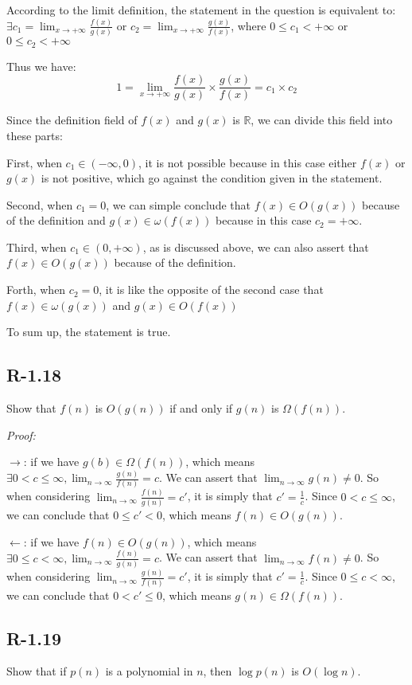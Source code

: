 \documentclass[11pt]{article}
\begin{document}
	According to the limit definition, the statement in the question is equivalent to: $\exists c_1=\lim_{x\to+\infty} \frac{f(x)}{g(x)}$ or $c_2=\lim_{x\to+\infty}\frac{g(x)}{f(x)}$, where $0\leq c_1<+\infty$ or $0\leq c_2<+\infty$
	
	Thus we have:
	\begin{equation*}
		1=\lim_{x\to+\infty} \frac{f(x)}{g(x)} \times \frac{g(x)}{f(x)} = c_1 \times c_2
	\end{equation*}
	
	Since the definition field of $f(x)$ and $g(x)$ is $\mathbb{R}$, we can divide this field into these parts:
	
	First, when $c_1 \in (-\infty,0)$, it is not possible because in this case either $f(x)$ or $g(x)$ is not positive, which go against the condition given in the statement.
	
	Second, when $c_1 = 0$, we can simple conclude that $f(x)\in O(g(x))$ because of the definition and $g(x)\in \omega(f(x))$ because in this case $c_2 = +\infty$.
	
	Third, when $c_1 \in(0,+\infty)$, as is discussed above, we can also assert that $f(x)\in O(g(x))$ because of the definition.
	
	Forth, when $c_2 = 0$, it is like the opposite of the second case that $f(x)\in \omega(g(x))$ and $g(x)\in O(f(x))$
	
	To sum up, the statement is true.
\subsection{R-1.18}
	Show that $f(n)$ is $O(g(n))$ if and only if $g(n)$ is $\Omega(f(n))$.

	\emph{Proof:}

	$\to$: if we have $g(b)\in \Omega(f(n))$, which means $\exists 0<c\leq \infty, \lim_{n\to\infty} \frac{g(n)}{f(n)}=c$. We can assert that $\lim_{n\to\infty}g(n) \not =0$. So when considering $\lim_{n\to\infty}\frac{f(n)}{g(n)} =c'$, it is simply that $c' =\frac{1}{c}$. Since $0<c\leq \infty$, we can conclude that $0\leq c'<0$, which means $f(n)\in O(g(n))$.
	
	$\gets$: if we have $f(n)\in O(g(n))$, which means $\exists 0\leq c< \infty, \lim_{n\to\infty} \frac{f(n)}{g(n)}=c$. We can assert that $\lim_{n\to\infty}f(n) \not =0$. So when considering $\lim_{n\to\infty}\frac{g(n)}{f(n)} =c'$, it is simply that $c' =\frac{1}{c}$. Since $0\leq c< \infty$, we can conclude that $0< c'\leq0$, which means $g(n) \in \Omega(f(n))$.
\subsection{R-1.19}
	Show that if $p(n)$ is a polynomial in $n$, then $\log p(n)$ is $O(\log n)$.
\end{document}
